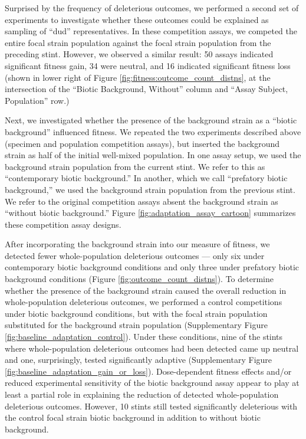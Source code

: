 Surprised by the frequency of deleterious outcomes, we performed a second set of experiments to investigate whether these outcomes could be explained as sampling of ``dud'' representatives.
In these competition assays, we competed the entire focal strain population against the focal strain population from the preceding stint.
However, we observed a similar result: 50 assays indicated significant fitness gain, 34 were neutral, and 16 indicated significant fitness loss (shown in lower right of Figure \ref{fig:fitness:outcome_count_distns}, at the intersection of the ``Biotic Background, Without'' column and ``Assay Subject, Population'' row.)



Next, we investigated whether the presence of the background strain as a ``biotic background'' influenced fitness.
We repeated the two experiments described above (specimen and population competition assays), but inserted the background strain as half of the initial well-mixed population.
In one assay setup, we used the background strain population from the current stint.
We refer to this as ``contemporary biotic background.''
In another, which we call ``prefatory biotic background,'' we used the background strain population from the previous stint.
We refer to the original competition assays absent the background strain as ``without biotic background.''
Figure \ref{fig:adaptation_assay_cartoon} summarizes these competition assay designs.



After incorporating the background strain into our measure of fitness, we detected fewer whole-population deleterious outcomes --- only six under contemporary biotic background conditions and only three under prefatory biotic background conditions (Figure \ref{fig:outcome_count_distns}).
To determine whether the presence of the background strain caused the overall reduction in whole-population deleterious outcomes, we performed a control competitions under biotic background conditions, but with the focal strain population substituted for the background strain population (Supplementary Figure \ref{fig:baseline_adaptation_control}).
Under these conditions, nine of the stints where whole-population deleterious outcomes had been detected came up neutral and one, surprisingly, tested significantly adaptive (Supplementary Figure \ref{fig:baseline_adaptation_gain_or_loss}).
Dose-dependent fitness effects and/or reduced experimental sensitivity of the biotic background assay appear to play at least a partial role in explaining the reduction of detected whole-population deleterious outcomes.
However, 10 stints still tested significantly deleterious with the control focal strain biotic background in addition to without biotic background.

